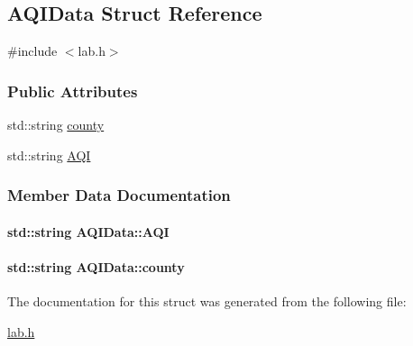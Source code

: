 \hypertarget{structAQIData}{\subsection{A\+Q\+I\+Data Struct Reference}
\label{structAQIData}
}


{\ttfamily \#include $<$lab.\+h$>$}

\subsubsection*{Public Attributes}
\begin{DoxyCompactItemize}
\item 
std\+::string \hyperlink{structAQIData_af9ac1abc791a7df144f3dba5c53c0f1a}{county}
\item 
std\+::string \hyperlink{structAQIData_a5077140b5e97ceba8b82a776647fb667}{A\+Q\+I}
\end{DoxyCompactItemize}


\subsubsection{Member Data Documentation}
\hypertarget{structAQIData_a5077140b5e97ceba8b82a776647fb667}{
\paragraph[{A\+Q\+I}]{\setlength{\rightskip}{0pt plus 5cm}std\+::string A\+Q\+I\+Data\+::\+A\+Q\+I}}\label{structAQIData_a5077140b5e97ceba8b82a776647fb667}
\hypertarget{structAQIData_af9ac1abc791a7df144f3dba5c53c0f1a}{
\paragraph[{county}]{\setlength{\rightskip}{0pt plus 5cm}std\+::string A\+Q\+I\+Data\+::county}}\label{structAQIData_af9ac1abc791a7df144f3dba5c53c0f1a}


The documentation for this struct was generated from the following file\+:\begin{DoxyCompactItemize}
\item 
\hyperlink{lab_8h}{lab.\+h}\end{DoxyCompactItemize}
